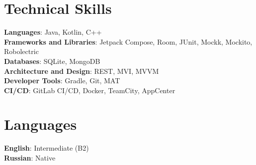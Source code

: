 \documentclass[letterpaper,11pt]{article}
\begin{document}
%
\section{Technical Skills}
 \begin{itemize}[leftmargin=0.15in, label={}]
    \small{\item{
     \textbf{Languages}{: Java, Kotlin, C++} \\
     \textbf{Frameworks and Libraries}{: Jetpack Compose, Room, JUnit, Mockk, Mockito, Robolectric } \\
     \textbf{Databases}{: SQLite, MongoDB } \\
     \textbf{Architecture and Design}{: REST, MVI, MVVM } \\
     \textbf{Developer Tools}{: Gradle, Git, MAT } \\
     \textbf{CI/CD}{: GitLab CI/CD, Docker, TeamCity, AppCenter} \\
    }}
 \end{itemize}


\section{Languages}
 \begin{itemize}[leftmargin=0.15in, label={}]
    \small{\item{
     \textbf{English}{: Intermediate (B2)} \\
     \textbf{Russian}{: Native}
    }}
 \end{itemize}

\end{document}
